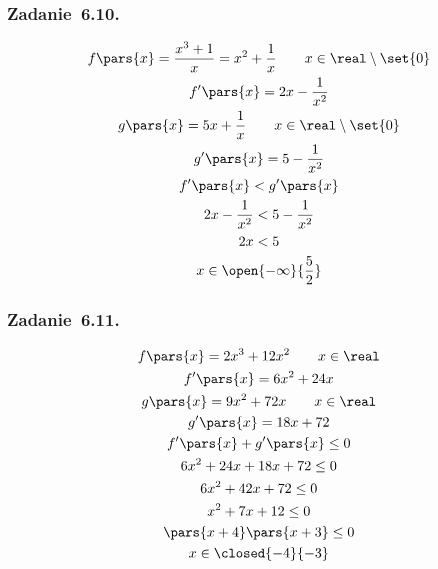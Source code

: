 \subsubsection*{Zadanie~6.10.}
\begin{gather*}
    f\pars{x} = \frac{x^3 + 1}{x} = x^2 + \frac{1}{x} \qquad x \in \real \setminus \set{0}\\
    f'\pars{x} = 2x - \frac{1}{x^2}\\
    g\pars{x} = 5x + \frac{1}{x} \qquad x \in \real \setminus \set{0}\\
    g'\pars{x} = 5 - \frac{1}{x^2}\\
    f'\pars{x} < g'\pars{x}\\
    2x - \frac{1}{x^2} < 5 - \frac{1}{x^2}\\
    2x < 5\\
    x \in \open{-\infty}{\frac{5}{2}}
\end{gather*}
\subsubsection*{Zadanie~6.11.}
\begin{gather*}
    f\pars{x} = 2x^3 + 12x^2 \qquad x \in \real\\
    f'\pars{x} = 6x^2 + 24x\\
    g\pars{x} = 9x^2 + 72x \qquad x \in \real\\
    g'\pars{x} = 18x + 72\\
    f'\pars{x} + g'\pars{x} \leq 0\\
    6x^2 + 24x + 18x + 72 \leq 0\\
    6x^2 + 42x + 72 \leq 0\\
    x^2 + 7x + 12 \leq 0\\
    \pars{x + 4}\pars{x + 3} \leq 0\\
    x \in \closed{-4}{-3}
\end{gather*}
